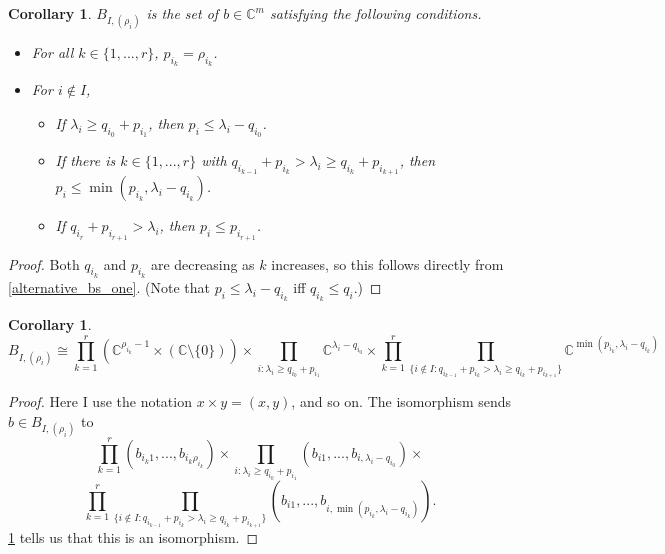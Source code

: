\documentclass[12pt,psamsfonts]{article}
\newtheorem{corollary}[theorem]{Corollary}
\begin{document}
\begin{corollary}\label{alternative_bs_two}
    \(B_{I, (\rho_i)}\) is the set of \(b \in \mathbb{C}^m\) satisfying the following conditions.
    \begin{itemize}
        \item For all \(k \in \{1, ..., r\}\), \(p_{i_k} = \rho_{i_k}\).
        \item For \(i \notin I\),
        \begin{itemize}
            \item If \(\lambda_i \geq q_{i_0} + p_{i_1}\), then \(p_i \leq \lambda_i - q_{i_0}\).
            \item If there is \(k \in \{1, ..., r\}\) with \(q_{i_{k - 1}} + p_{i_k} > \lambda_i \geq q_{i_k} + p_{i_{k + 1}}\), then \(p_i \leq \min(p_{i_k}, \lambda_i - q_{i_k})\).
            \item If \(q_{i_r} + p_{i_{r + 1}} > \lambda_i\), then \(p_i \leq p_{i_{r + 1}}\).
        \end{itemize}
    \end{itemize}
\end{corollary}
\begin{proof}
    Both \(q_{i_k}\) and \(p_{i_k}\) are decreasing as \(k\) increases, so this follows directly from \cref{alternative_bs_one}.
    (Note that \(p_i \leq \lambda_i - q_{i_k}\) iff \(q_{i_k} \leq q_i\).)
\end{proof}

\begin{corollary}\label{bs_iso}
    \[B_{I, (\rho_i)} \cong \prod_{k = 1}^r (\mathbb{C}^{\rho_{i_k} - 1} \times (\mathbb{C} \setminus \{0\})) \times \prod_{i : \lambda_i \geq q_{i_0} + p_{i_1}} \mathbb{C}^{\lambda_i - q_{i_0}} \times \prod_{k = 1}^r \prod_{\{i \notin I : q_{i_{k - 1}} + p_{i_k} > \lambda_i \geq q_{i_k} + p_{i_{k + 1}}\}}\mathbb{C}^{\min(p_{i_k}, \lambda_i - q_{i_k})}\]
\end{corollary}
\begin{proof}
    Here I use the notation \(x \times y = (x, y)\), and so on.
    The isomorphism sends \(b \in B_{I, (\rho_i)}\) to 
    \[\prod_{k = 1}^{r}(b_{i_k1},..., b_{i_k\rho_{i_k}}) \times \prod_{i : \lambda_i \geq q_{i_0} + p_{i_1}} (b_{i1}, ..., b_{i, \lambda_i - q_{i_0}}) \times\]
    \[\prod_{k = 1}^r \prod_{\{i \notin I : q_{i_{k - 1}} + p_{i_k} > \lambda_i \geq q_{i_k} + p_{i_{k + 1}}\}} (b_{i1}, ..., b_{i,\min(p_{i_k}, \lambda_i - q_{i_k})}).\]
    \cref{alternative_bs_two} tells us that this is an isomorphism.
\end{proof}
\end{document}
